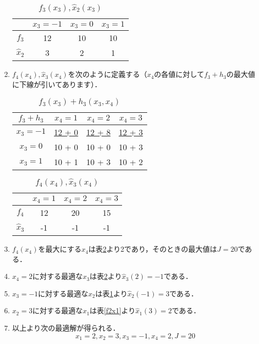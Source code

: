 \documentclass[a5paper]{jarticle}
\begin{document}
\begin{enumerate}
\begin{table}[H]
   \end{table}
   \begin{table}[H]
   \begin{center}
   \caption{$f_3(x_3), \hat x_2(x_3)$}
   \begin{tabular}{|c||c|c|c|} \hline
    & $x_3 = -1$ & $x_3 = 0$ & $x_3 = 1$ \\ \hline \hline
    $f_3$ & 12 & 10 & 10 \\
    $\hat x_2$ & 3 & 2 & 1 \\ \hline
   \end{tabular}
   \label{f3x2}
   \end{center}
   \end{table}
   \item $f_4(x_4), \hat x_3(x_4)$を次のように定義する（$x_4$の各値に対して$f_3 + h_3$の最大値に下線が引いてあります）．
   \begin{table}[H]
   \begin{center}
   \caption{$f_3(x_3) + h_3(x_3, x_4)$}
   \begin{tabular}{|c||c|c|c|} \hline
    $f_3 + h_3$ & $x_4 = 1$ & $x_4 = 2$ & $x_4 = 3$ \\ \hline \hline
    $x_3 = -1$ & \underline{12 + 0} & \underline{12 + 8} & \underline{12 + 3} \\
    $x_3 = 0$ & 10 + 0 & 10 + 0 & 10 + 3 \\
    $x_3 = 1$ & 10 + 1 & 10 + 3 & 10 + 2 \\ \hline
   \end{tabular}
   \end{center}
   \end{table}
   \begin{table}[H]
   \begin{center}
   \caption{$f_4(x_4), \hat x_3(x_4)$}
   \begin{tabular}{|c||c|c|c|} \hline
    & $x_4 = 1$ & $x_4 = 2$ & $x_4 = 3$ \\ \hline \hline
    $f_4$ & 12 & 20 & 15 \\
    $\hat x_3$ & -1 & -1 & -1 \\ \hline
   \end{tabular}
   \label{f4x3}
   \end{center}
   \end{table}
   \item $f_4(x_4)$を最大にする$x_4$は表\ref{f4x3}より2であり，そのときの最大値は$J = 20$である．
   \item $x_4 = 2$に対する最適な$x_3$は表\ref{f4x3}より$\hat x_3(2) = -1$である．
   \item $x_3 = -1$に対する最適な$x_2$は表\ref{f3x2}より$\hat x_2(-1) = 3$である．
   \item $x_2 = 3$に対する最適な$x_1$は表\ref{f2x1}より$\hat x_1(3) = 2$である．
   \item 以上より次の最適解が得られる．
   \[
   x_1 = 2, x_2 = 3, x_3 = -1, x_4 = 2, J = 20
   \]
\end{enumerate}
\end{document}
